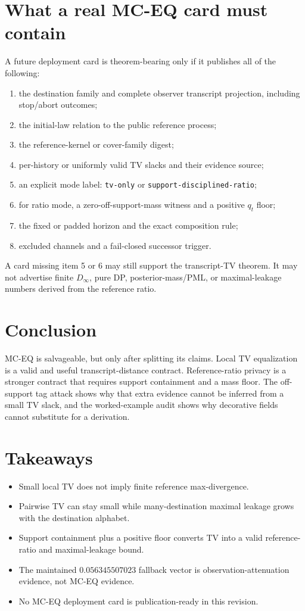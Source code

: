 \documentclass[11pt]{article}
\begin{document}
\section{What a real MC-EQ card must contain}
A future deployment card is theorem-bearing only if it publishes all of the following:
\begin{enumerate}[leftmargin=1.5em]
\item the destination family and complete observer transcript projection, including stop/abort outcomes;
\item the initial-law relation to the public reference process;
\item the reference-kernel or cover-family digest;
\item per-history or uniformly valid TV slacks and their evidence source;
\item an explicit mode label: \texttt{tv-only} or \texttt{support-disciplined-ratio};
\item for ratio mode, a zero-off-support-mass witness and a positive $q_t$ floor;
\item the fixed or padded horizon and the exact composition rule;
\item excluded channels and a fail-closed successor trigger.
\end{enumerate}
A card missing item 5 or 6 may still support the transcript-TV theorem.  It may not advertise finite $D_\infty$, pure DP, posterior-mass/PML, or maximal-leakage numbers derived from the reference ratio.

\section{Conclusion}
MC-EQ is salvageable, but only after splitting its claims.  Local TV equalization is a valid and useful transcript-distance contract.  Reference-ratio privacy is a stronger contract that requires support containment and a mass floor.  The off-support tag attack shows why that extra evidence cannot be inferred from a small TV slack, and the worked-example audit shows why decorative fields cannot substitute for a derivation.

\section{Takeaways}
\begin{itemize}[leftmargin=*]
\item Small local TV does not imply finite reference max-divergence.
\item Pairwise TV can stay small while many-destination maximal leakage grows with the destination alphabet.
\item Support containment plus a positive floor converts TV into a valid reference-ratio and maximal-leakage bound.
\item The maintained $0.056345507023$ fallback vector is observation-attenuation evidence, not MC-EQ evidence.
\item No MC-EQ deployment card is publication-ready in this revision.
\end{itemize}
\end{document}

